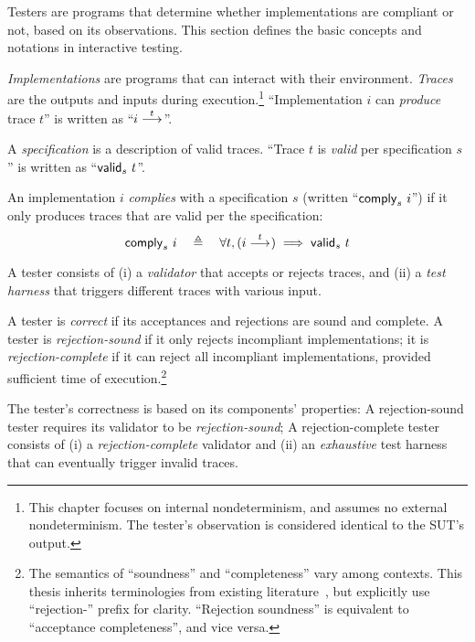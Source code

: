 Testers are programs that determine whether implementations are compliant or
not, based on its observations.  This section defines the basic concepts and
notations in interactive testing.

\begin{definition}
  {\em Implementations} are programs that can interact with their environment.
  {\em Traces} are the outputs and inputs during execution.\footnote{This
    chapter focuses on internal nondeterminism, and assumes no external
    nondeterminism.  The tester's observation is considered identical to the
    SUT's output.}  ``Implementation $i$ can {\em produce} trace $t$'' is
  written as ``$i\overset{t}\longrightarrow_{}$''.
\end{definition}

\begin{definition}
  A {\em specification} is a description of valid traces.  ``Trace $t$ is {\em
    valid} per specification $s$'' is written as ``$\mathsf{valid}_{s}~{t}$''.

  An implementation $i$ {\em complies} with a specification $s$ (written
  ``$\mathsf{comply}_{s}~{i}$'') if it only produces traces that are valid per the
  specification:
  \[\mathsf{comply}_{s}~{i}\quad\triangleq\quad\forall t,(i\overset{t}\longrightarrow_{})\implies\mathsf{valid}_{s}~{t}\]
\end{definition}

\begin{definition}
  A tester consists of (i) a {\em validator} that accepts or rejects traces, and
  (ii) a {\em test harness} that triggers different traces with various input.

  A tester is {\em correct} if its acceptances and rejections are sound and
  complete.  A tester is {\em rejection-sound} if it only rejects incompliant
  implementations; it is {\em rejection-complete} if it can reject all
  incompliant implementations, provided sufficient time of
  execution.\footnote{The semantics of ``soundness'' and ``completeness'' vary
    among contexts.  This thesis inherits terminologies from existing
    literature~\cite{Tretmans}, but explicitly use ``rejection-'' prefix for
    clarity.  ``Rejection soundness'' is equivalent to ``acceptance
    completeness'', and vice versa.}

  The tester's correctness is based on its components' properties: A
  rejection-sound tester requires its validator to be {\em rejection-sound}; A
  rejection-complete tester consists of (i) a {\em rejection-complete} validator
  and (ii) an {\em exhaustive} test harness that can eventually trigger invalid
  traces.
\end{definition}

